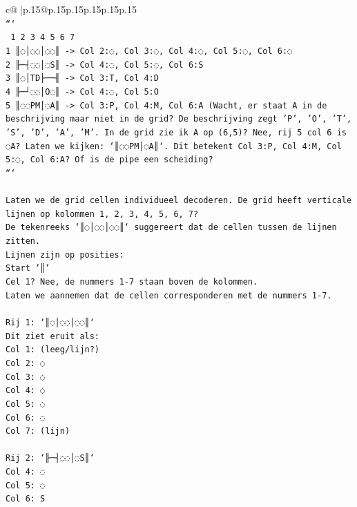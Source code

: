 \documentclass{article}
\begin{document}
{\begin{supertabular}{c@{$\;$}|p{.15\linewidth}@{}p{.15\linewidth}p{.15\linewidth}p{.15\linewidth}p{.15\linewidth}p{.15\linewidth}}
{{{\\ 
\texttt{```} \\
\texttt{  1 2 3 4 5 6 7} \\
\texttt{1 ║◌│◌◌│◌◌║  {-}> Col 2:◌, Col 3:◌, Col 4:◌, Col 5:◌, Col 6:◌} \\
\texttt{2 ╟─┤◌◌│◌S║  {-}> Col 4:◌, Col 5:◌, Col 6:S} \\
\texttt{3 ║◌│TD├──╢  {-}> Col 3:T, Col 4:D} \\
\texttt{4 ╟─┘◌◌│O◌║  {-}> Col 4:◌, Col 5:O} \\
\texttt{5 ║◌◌PM│◌A║  {-}> Col 3:P, Col 4:M, Col 6:A (Wacht, er staat A in de beschrijving maar niet in de grid? De beschrijving zegt 'P', 'O', 'T', 'S', 'D', 'A', 'M'. In de grid zie ik A op (6,5)? Nee, rij 5 col 6 is ◌A? Laten we kijken: `║◌◌PM│◌A║`. Dit betekent Col 3:P, Col 4:M, Col 5:◌, Col 6:A? Of is de pipe een scheiding?} \\
\texttt{```} \\
\\ 
\texttt{Laten we de grid cellen individueel decoderen. De grid heeft verticale lijnen op kolommen 1, 2, 3, 4, 5, 6, 7?} \\
\texttt{De tekenreeks `║◌│◌◌│◌◌║` suggereert dat de cellen tussen de lijnen zitten.} \\
\texttt{Lijnen zijn op posities:} \\
\texttt{Start `║`} \\
\texttt{Cel 1? Nee, de nummers 1{-}7 staan boven de kolommen.} \\
\texttt{Laten we aannemen dat de cellen corresponderen met de nummers 1{-}7.} \\
\\ 
\texttt{Rij 1: `║◌│◌◌│◌◌║`} \\
\texttt{Dit ziet eruit als:} \\
\texttt{Col 1: (leeg/lijn?)} \\
\texttt{Col 2: ◌} \\
\texttt{Col 3: ◌} \\
\texttt{Col 4: ◌} \\
\texttt{Col 5: ◌} \\
\texttt{Col 6: ◌} \\
\texttt{Col 7: (lijn)} \\
\\ 
\texttt{Rij 2: `╟─┤◌◌│◌S║`} \\
\texttt{Col 4: ◌} \\
\texttt{Col 5: ◌} \\
\texttt{Col 6: S} \\
}}}
\end{supertabular}}
\end{document}
